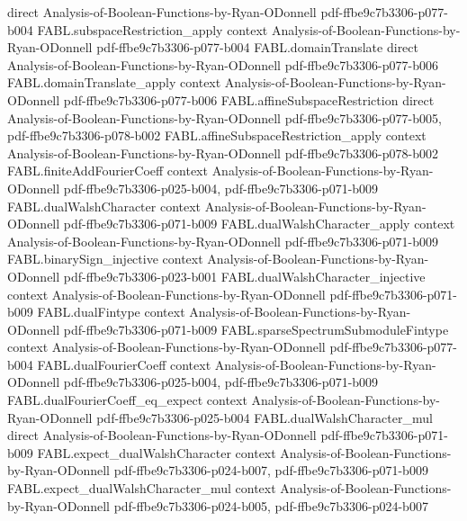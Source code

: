 \begin{theorem}
  {direct}
  {Analysis-of-Boolean-Functions-by-Ryan-ODonnell}
  {pdf-ffbe9c7b3306-p077-b004}
\proofstep
  {FABL.subspaceRestriction_apply}
  {context}
  {Analysis-of-Boolean-Functions-by-Ryan-ODonnell}
  {pdf-ffbe9c7b3306-p077-b004}
\proofstep
  {FABL.domainTranslate}
  {direct}
  {Analysis-of-Boolean-Functions-by-Ryan-ODonnell}
  {pdf-ffbe9c7b3306-p077-b006}
\proofstep
  {FABL.domainTranslate_apply}
  {context}
  {Analysis-of-Boolean-Functions-by-Ryan-ODonnell}
  {pdf-ffbe9c7b3306-p077-b006}
\proofstep
  {FABL.affineSubspaceRestriction}
  {direct}
  {Analysis-of-Boolean-Functions-by-Ryan-ODonnell}
  {pdf-ffbe9c7b3306-p077-b005,
    pdf-ffbe9c7b3306-p078-b002}
\proofstep
  {FABL.affineSubspaceRestriction_apply}
  {context}
  {Analysis-of-Boolean-Functions-by-Ryan-ODonnell}
  {pdf-ffbe9c7b3306-p078-b002}
\proofstep
  {FABL.finiteAddFourierCoeff}
  {context}
  {Analysis-of-Boolean-Functions-by-Ryan-ODonnell}
  {pdf-ffbe9c7b3306-p025-b004,
    pdf-ffbe9c7b3306-p071-b009}
\proofstep
  {FABL.dualWalshCharacter}
  {context}
  {Analysis-of-Boolean-Functions-by-Ryan-ODonnell}
  {pdf-ffbe9c7b3306-p071-b009}
\proofstep
  {FABL.dualWalshCharacter_apply}
  {context}
  {Analysis-of-Boolean-Functions-by-Ryan-ODonnell}
  {pdf-ffbe9c7b3306-p071-b009}
\proofstep
  {FABL.binarySign_injective}
  {context}
  {Analysis-of-Boolean-Functions-by-Ryan-ODonnell}
  {pdf-ffbe9c7b3306-p023-b001}
\proofstep
  {FABL.dualWalshCharacter_injective}
  {context}
  {Analysis-of-Boolean-Functions-by-Ryan-ODonnell}
  {pdf-ffbe9c7b3306-p071-b009}
\proofstep
  {FABL.dualFintype}
  {context}
  {Analysis-of-Boolean-Functions-by-Ryan-ODonnell}
  {pdf-ffbe9c7b3306-p071-b009}
\proofstep
  {FABL.sparseSpectrumSubmoduleFintype}
  {context}
  {Analysis-of-Boolean-Functions-by-Ryan-ODonnell}
  {pdf-ffbe9c7b3306-p077-b004}
\proofstep
  {FABL.dualFourierCoeff}
  {context}
  {Analysis-of-Boolean-Functions-by-Ryan-ODonnell}
  {pdf-ffbe9c7b3306-p025-b004,
    pdf-ffbe9c7b3306-p071-b009}
\proofstep
  {FABL.dualFourierCoeff_eq_expect}
  {context}
  {Analysis-of-Boolean-Functions-by-Ryan-ODonnell}
  {pdf-ffbe9c7b3306-p025-b004}
\proofstep
  {FABL.dualWalshCharacter_mul}
  {direct}
  {Analysis-of-Boolean-Functions-by-Ryan-ODonnell}
  {pdf-ffbe9c7b3306-p071-b009}
\proofstep
  {FABL.expect_dualWalshCharacter}
  {context}
  {Analysis-of-Boolean-Functions-by-Ryan-ODonnell}
  {pdf-ffbe9c7b3306-p024-b007,
    pdf-ffbe9c7b3306-p071-b009}
\proofstep
  {FABL.expect_dualWalshCharacter_mul}
  {context}
  {Analysis-of-Boolean-Functions-by-Ryan-ODonnell}
  {pdf-ffbe9c7b3306-p024-b005,
    pdf-ffbe9c7b3306-p024-b007}
\proofstep

\end{theorem}
